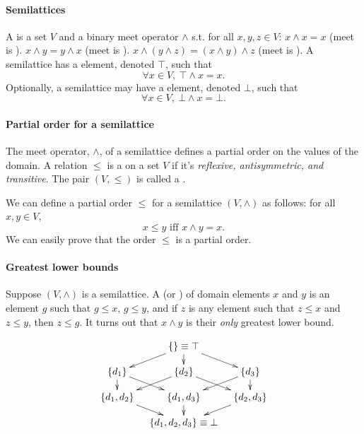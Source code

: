 \documentclass{memo}
\begin{document}
\paragraph{Semilattices}
A  is a set $V$ and a binary meet operator $\wedge$ s.t. for
all $x, y, z \in V$: 
\ben
\w [(a)] $x \wedge x = x$ (meet is ).
\w [(b)] $x \wedge y = y \wedge x$ (meet is ).
\w [(c)] $x \wedge (y \wedge z) = (x \wedge y) \wedge z$ (meet is ).
\een
A semilattice has a  element, denoted $\top$, such that
   \[ \forall{x \in V},\ \top \wedge x = x. \]
Optionally, a semilattice may have a  element, denoted $\bot$, such
that 
   \[ \forall{x \in V},\ \bot \wedge x = \bot. \]

\paragraph{Partial order for a semilattice}
The meet operator, $\wedge$, of a semilattice defines a partial order on the
values of the domain. A relation $\le$ is a  on a set $V$ if
it's {\em reflexive, antisymmetric, and transitive}. 
The pair $(V, \le)$ is called a . 

We can define a partial order $\le$ for a semilattice $(V, \wedge)$ as
follows: for all $x, y  \in V$, 
\[ x \le y \mbox{\ iff\ } x \wedge y = x. \]
We can easily prove that the order $\le$ is a partial order. 

\paragraph{Greatest lower bounds}
Suppose $(V, \wedge)$ is a semilattice. A  (or
) of domain elements $x$ and $y$ is an element $g$ such that
\ben
\w [(a)] $g \le x$,
\w [(b)] $g \le y$, and
\w [(c)] if $z$ is any element such that $z \le x$ and $z \le y$, then $z \le
g$. 
\een
It turns out that $x \wedge y$ is their {\em only\/} greatest lower bound.

\[ \xymatrix@-0.5cm{
    & \{\} \equiv \top \ar[ld]\ar[d]\ar[rd]&  \\ 
 \{d_1\}\ar[d]\ar[rd] & \{d_2\} \ar[ld]\ar[rd]& \{d_3\}\ar[ld]\ar[d] \\
 \{d_1,d_2\} \ar[rd]& \{d_1,d_3\} \ar[d]& \{d_2, d_3\}\ar[ld] \\
  & \{d_1,d_2,d_3\} \equiv \bot & 
}
\]
\end{document}
